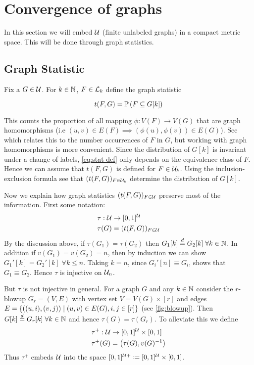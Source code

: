 \documentclass{article}
\begin{document}
\section{Convergence of graphs}
\label{sec:formal}
In this section we will embed $\Ug$ (finite unlabeled graphs) in a compact metric space. This will be done through graph statistics.

\subsection{Graph Statistic}

Fix a $G \in \Ug$. For $k \in \N$, $F \in \Lg_{k}$  define the graph statistic

\begin{equation}
  t(F, G) = \Pb(F \subseteq G[k])
  \label{eq:stat-def}
\end{equation}

This counts the proportion of all mapping $\phi : V(F) \to V(G)$ that are graph homomorphisms (i.e $(u, v) \in E(F) \implies (\phi(u), \phi(v)) \in E(G)$). See \cite[p.~6]{paper} which relates this to the number occurrences of $F$ in $G$, but working with graph homomorphisms is more convenient. Since the distribution of $G[k]$ is invariant under a change of labels, \eqref{eq:stat-def} only depends on the equivalence class of $F$. Hence we can assume that $t(F,G)$ is defined for $F \in \Ug_{k}$.  Using the inclusion-exclusion formula see that $(t(F, G))_{F \in \Ug_{k}}$ determine the distribution of $G[k]$. 

Now we explain how graph statistics $(t(F,G))_{F \in \Ug}$ preserve most of the information. First some notation:
\begin{align}
  \tau : \Ug &\to [0,1]^{\Ug} \nonumber\\
  \tau(G) &= (t(F, G))_{F \in \Ug}
  \label{eq:tau}
\end{align}
By the discussion above, if $\tau(G_1) = \tau(G_2)$  then $G_1[k] \dequal G_2[k] \; \forall k \in \N$.
In addition if $v(G_1) = v(G_2) = n$, then by induction we can show $G_1'[k] = G_2'[k] \; \forall k \leq n$. Taking $k=n$, since $G_i'[n] \equiv G_i$, shows that $G_1 \equiv G_2$. Hence $\tau$ is injective on $\Ug_{n}$. 

But $\tau$ is not injective in general. For a graph $G$ and any $k \in \N$ consider the $r$-blowup $G_r=(V,E)$ with vertex set $V = V(G) \times [r]$ and edges $E=\left\{ ((u, i), (v, j)) \mid (u,v) \in E(G), i,j \in [r] \right\}$ (see \autoref{fig:blowup}). Then  $G[k] \dequal G_r[k] \; \forall k \in \N$ and hence $\tau(G) = \tau(G_r)$. To alleviate this we define
\begin{align}
  \tau^+ : \Ug &\to [0,1]^{\Ug} \times [0, 1] \nonumber \\
  \tau^+(G) &= \left(\tau(G), v(G)^{-1}\right)
  \label{eq:embedding}
\end{align}
Thus $\tau^+$ embeds $\Ug$ into the space $[0,1]^{\Ug+} \coloneqq [0,1]^{\Ug}\times [0,1]$. 
\end{document}
